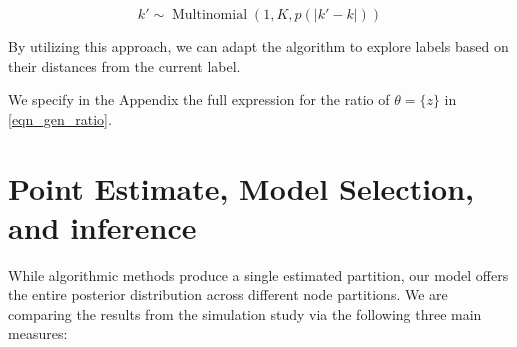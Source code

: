 \documentclass[11pt]{amsart}
\begin{document}
\begin{equation}
k' \sim \operatorname{Multinomial}(1, K, p(|k' - k|))
\end{equation}

By utilizing this approach, we can adapt the algorithm to explore labels based on their distances from the current label. 

We specify in the Appendix the full expression for the ratio of $\theta = \{z\}$ in \eqref{eqn_gen_ratio}.


\clearpage

\section{Point Estimate, Model Selection,  and inference}

While algorithmic methods produce a single estimated partition, our model offers the entire posterior distribution across different node partitions. We are comparing the results from the simulation study via the following three main measures:
\end{document}
